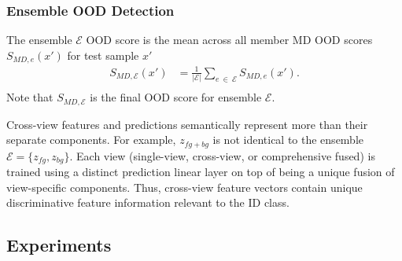 %
\subsubsection{Ensemble OOD Detection}
The ensemble $\mathcal{E}$ OOD score is the mean across all member MD OOD scores $S_{MD,e}(x')$ for test sample $x'$
\begin{equation}
\begin{aligned}
    S_{MD,\mathcal{E}}(x') & = \frac{1}{\lvert \mathcal{E} \rvert} \sum_{e ~\in~ \mathcal{E}} S_{MD,e}(x'). \\
\end{aligned}
\end{equation}
Note that $S_{MD,\mathcal{E}}$ is the final OOD score for ensemble $\mathcal{E}$.

Cross-view features and predictions semantically represent more than their separate components. For example, $z_{fg+bg}$ is not identical to the ensemble $\mathcal{E} = \{z_{fg}, z_{bg}\}$. Each view (single-view, cross-view, or comprehensive fused) is trained using a distinct prediction linear layer on top of being a unique fusion of view-specific components. Thus, cross-view feature vectors contain unique discriminative feature information relevant to the ID class.

\subsection{Experiments}
\label{sec:propwork-meo-exp}


